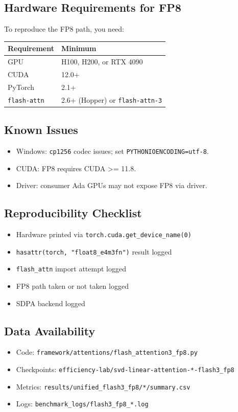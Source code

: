 \subsection{Hardware Requirements for FP8}

To reproduce the FP8 path, you need:

\begin{table}[H]
\centering
\small
\begin{tabular}{ll}
\toprule
\textbf{Requirement} & \textbf{Minimum} \\
\midrule
GPU & H100, H200, or RTX 4090 \\
CUDA & 12.0+ \\
PyTorch & 2.1+ \\
\texttt{flash-attn} & 2.6+ (Hopper) or \texttt{flash-attn-3} \\
\bottomrule
\end{tabular}
\end{table}

\subsection{Known Issues}

\begin{itemize}
\item Windows: \texttt{cp1256} codec issues; set \texttt{PYTHONIOENCODING=utf-8}.
\item CUDA: FP8 requires CUDA >= 11.8.
\item Driver: consumer Ada GPUs may not expose FP8 via driver.

\end{itemize}
\subsection{Reproducibility Checklist}

\begin{itemize}
\item [ ] Hardware printed via \texttt{torch.cuda.get\_device\_name(0)}
\item [ ] \texttt{hasattr(torch, "float8\_e4m3fn")} result logged
\item [ ] \texttt{flash\_attn} import attempt logged
\item [ ] FP8 path taken or not taken logged
\item [ ] SDPA backend logged

\end{itemize}
\subsection{Data Availability}

\begin{itemize}
\item Code: \texttt{framework/attentions/flash\_attention3\_fp8.py}
\item Checkpoints: \texttt{efficiency-lab/svd-linear-attention-*-flash3\_fp8}
\item Metrics: \texttt{results/unified\_flash3\_fp8/*/summary.csv}
\item Logs: \texttt{benchmark\_logs/flash3\_fp8\_*.log}

\end{itemize}
